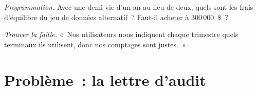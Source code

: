\begin{exercise}[$\star\star\star$]\label{exo:fm:data-strategy-and-costs:7}
\emph{Programmation.} Avec une demi-vie d'un an au lieu de deux, quels sont les frais d'équilibre du jeu de données alternatif~? Faut-il acheter à 300\,000~\$~?
\end{exercise}

\begin{exercise}[$\star\star\star$]\label{exo:fm:data-strategy-and-costs:8}
\emph{Trouver la faille.} «~Nos utilisateurs nous indiquent chaque trimestre quels terminaux ils utilisent, donc nos comptages sont justes.~»
\end{exercise}

\section{Problème~: la lettre d'audit}

